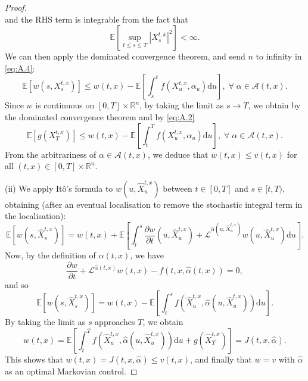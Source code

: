 \begin{proof}
\begin{equation*}
    \end{equation*}
    and the RHS term is integrable from the fact that 
    \begin{equation*}
        \mathbb{E}\left[\sup_{t\leq s\leq T}|X_s^{t,x}|^2\right]<\infty.
    \end{equation*}
    We can then apply the dominated convergence theorem, and send $n$ to infinity
    in \eqref{eq:A.4}:
    \begin{equation*}
        \mathbb{E}[w(s,X_s^{t,x})]\leq w(t,x)-\mathbb{E}\left[\int_s^tf(X_u^{t,x},\alpha_u)\mathrm du\right],\;\forall\;\alpha\in\mathcal{A}(t,x).
    \end{equation*}
    Since $w$ is continuous on $[0,T]\times\mathbb{R}^n$, by taking the limit as $s
    \rightarrow T$,
    we obtain by the dominated convergence theorem and by \eqref{eq:A.2}
    \begin{equation*}
        \mathbb{E}[g(X_T^{t,x})]\leq w(t,x)-\mathbb{E}\left[\int_t^Tf(X_u^{t,x},\alpha_u)\mathrm du\right],\;\forall\;\alpha\in\mathcal{A}(t,x).
    \end{equation*}
    From the arbitrariness of $\alpha\in\mathcal{A}(t,x)$, we deduce that $w(t,x)
    \leq v(t,x)$ for all $(t,x)\in[0,T]\times\mathbb{R}^n.$

    (ii) We apply It\^{o}'s formula to $w(u,\hat{X}_u^{t,x})$ between $t\in[0,T]$ 
    and $s\in[t,T)$, obtaining (after an eventual localisation to remove the stochastic 
    integral term in the localisation):
    \begin{equation*}
        \mathbb{E}[w(s,\hat{X}_s^{t,x})]=w(t,x)+\mathbb{E}\left[\int_t^s\frac{\partial w}{\partial t}(u,\hat{X}_u^{t,x})+\mathcal{L}^{\hat\alpha(u,\hat{X}_u^{t,x})}w(u,\hat{X}_u^{t,x})\mathrm du\right].
    \end{equation*}
    Now, by the definition of $\hat\alpha(t,x)$, we have 
    \begin{equation*}
        \frac{\partial w}{\partial t}+\mathcal{L}^{\hat\alpha(t,x)}w(t,x)-f(t,x,\hat\alpha(t,x))=0,
    \end{equation*}
    and so 
    \begin{equation*}
        \mathbb{E}[w(s,\hat{X}_s^{t,x})]=w(t,x)-\mathbb{E}\left[\int_t^sf(\hat{X}_u^{t,x},\hat{\alpha}(u,\hat{X}_u^{t,x}))\mathrm du\right].
    \end{equation*}
    By taking the limit as $s$ approaches $T$, we obtain
    \begin{equation*}
        w(t,x)=\mathbb{E}\left[\int_t^Tf(\hat{X}_u^{t,x},\hat\alpha(u,\hat{X}_u^{t,x}))\mathrm du+g(\hat{X}_T^{t,x})\right]=J(t,x,\hat{\alpha}).
    \end{equation*}
    This shows that $w(t,x)=J(t,x,\hat\alpha)\leq v(t,x)$, and finally that $w=v$
    with $\hat\alpha$ as an optimal Markovian control.
\end{proof}